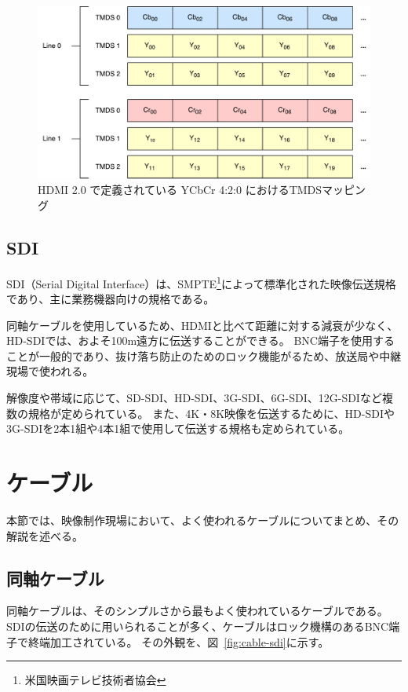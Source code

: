 \begin{figure}[htbp]
  \begin{center}
    \includegraphics[bb=0 0 591 306,width=15.5cm]{img/hdmi-spec-yuv-420.pdf}
  \end{center}
  \caption{HDMI 2.0 で定義されている YCbCr 4:2:0 におけるTMDSマッピング}
  \label{fig:hdmi-spec-yuv-420}
\end{figure}

\subsection{SDI}

SDI（Serial Digital Interface）は、SMPTE\footnote{米国映画テレビ技術者協会}によって標準化された映像伝送規格であり、主に業務機器向けの規格である。

同軸ケーブルを使用しているため、HDMIと比べて距離に対する減衰が少なく、HD-SDIでは、およそ100m遠方に伝送することができる。
BNC端子を使用することが一般的であり、抜け落ち防止のためのロック機能がるため、放送局や中継現場で使われる。

解像度や帯域に応じて、SD-SDI、HD-SDI、3G-SDI、6G-SDI、12G-SDIなど複数の規格が定められている。
また、4K・8K映像を伝送するために、HD-SDIや3G-SDIを2本1組や4本1組で使用して伝送する規格も定められている。

\section{ケーブル}
本節では、映像制作現場において、よく使われるケーブルについてまとめ、その解説を述べる。

\subsection{同軸ケーブル}
同軸ケーブルは、そのシンプルさから最もよく使われているケーブルである。SDIの伝送のために用いられることが多く、ケーブルはロック機構のあるBNC端子で終端加工されている。
その外観を、図~\ref{fig:cable-sdi}に示す。

